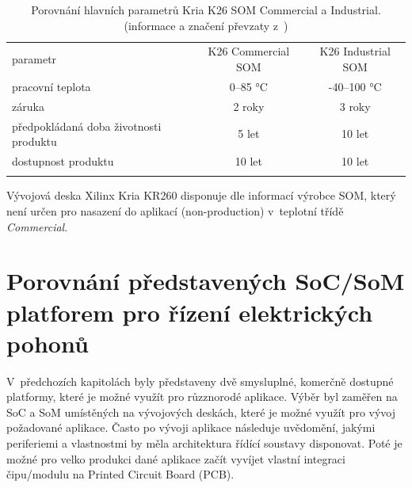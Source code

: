 \documentclass[a4paper, twoside, 11pt]{article}
\begin{document}
					\begin{table}[htbp!]
						\centering
						\caption{Porovnání hlavních parametrů Kria K26 SOM Commercial a Industrial. (informace a značení převzaty z~\cite{kria-k26-som-product-brief})}
						  \vspace*{0.15cm}
						   \resizebox{\textwidth}{!}
							{
								\begin{tabular}{!{\vrule width 2pt} l | c | c !{\vrule width 2pt}}
								parametr & K26 Commercial SOM & K26 Industrial SOM \\
								pracovní teplota & 0–85 °C & -40–100 °C\\ \hline
								záruka & 2 roky & 3 roky\\ \hline
								předpokládaná doba životnosti produktu & 5 let & 10 let\\ \hline 
								dostupnost produktu & 10 let & 10 let \\
								\end{tabular}
							}
						\label{tab:xilinx-kria-som-variants}
					\end{table}

					Vývojová deska Xilinx Kria KR260 disponuje dle informací výrobce SOM, který není určen pro nasazení do aplikací (non-production) v~teplotní třídě \textit{Commercial}. \cite{kria-k26-som-ds}
				

			\section{Porovnání představených SoC/SoM platforem pro řízení elektrických pohonů}
			V~předchozích kapitolách byly představeny dvě smysluplné, komerčně dostupné platformy, které je možné využít pro růzznorodé aplikace. Výběr byl zaměřen na SoC a SoM umístěných na vývojových deskách, které je možné využít pro vývoj požadované aplikace. Často po vývoji aplikace následuje uvědomění, jakými periferiemi a vlastnostmi by měla architektura řídící soustavy disponovat. Poté je možné pro velko produkci dané aplikace začít vyvíjet vlastní integraci čipu/modulu na Printed Circuit Board (PCB).\par
\end{document}
